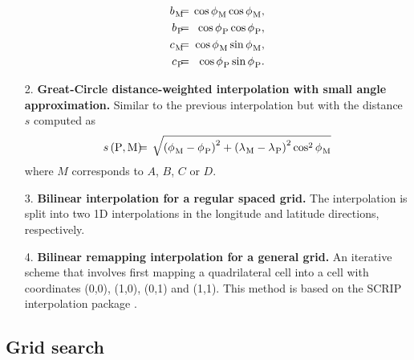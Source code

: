 \begin{enumerate}
\begin{eqnarray}
      {b_{}}_{\rm M} & \hspace{-2mm} = \hspace{-2mm} & \cos {\phi_{}}_{\rm M} \cos {\phi_{}}_{\rm M}, 
      \nonumber \\
      {b_{}}_{\rm P} & \hspace{-2mm} = \hspace{-2mm} & \cos {\phi_{}}_{\rm P} \cos {\phi_{}}_{\rm P}, 
      \nonumber \\
      {c_{}}_{\rm M} & \hspace{-2mm} = \hspace{-2mm} & \cos {\phi_{}}_{\rm M} \sin {\phi_{}}_{\rm M}, 
      \nonumber \\
      {c_{}}_{\rm P} & \hspace{-2mm} = \hspace{-2mm} & \cos {\phi_{}}_{\rm P} \sin {\phi_{}}_{\rm P}.
      \nonumber
   \nonumber
  \end{eqnarray}

\item[2.] {\bf Great-Circle distance-weighted interpolation with small angle
  approximation.} Similar to the previous interpolation but with the
  distance $s$ computed as
  \begin{eqnarray}
    s\left( {\rm P}, {\rm M} \right) 
     & \hspace{-2mm} = \hspace{-2mm} & 
      \sqrt{ \left( {\phi_{}}_{\rm M} - {\phi_{}}_{\rm P} \right)^{2} 
      + \left( {\lambda_{}}_{\rm M} - {\lambda_{}}_{\rm P} \right)^{2}
        \cos^{2} {\phi_{}}_{\rm M} }
  \end{eqnarray}
  where $M$ corresponds to $A$, $B$, $C$ or $D$.

\item[3.] {\bf Bilinear interpolation for a regular spaced grid.} The
  interpolation is split into two 1D interpolations in the longitude
  and latitude directions, respectively.

\item[4.] {\bf Bilinear remapping interpolation for a general grid.} An
  iterative scheme that involves first mapping a quadrilateral cell
  into a cell with coordinates (0,0), (1,0), (0,1) and (1,1). This
  method is based on the SCRIP interpolation package \citep{Jones_1998}.
  
\end{enumerate}

\subsection{Grid search}

